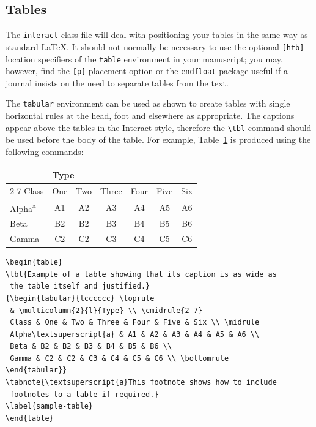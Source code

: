 \documentclass[]{interact}
\theoremstyle{plain}%
\theoremstyle{definition}
\theoremstyle{remark}
\begin{document}
\subsection{Tables}

The \texttt{interact} class file will deal with positioning your tables in the same way as standard \LaTeX. It should not normally be necessary to use the optional \texttt{[htb]} location specifiers of the \texttt{table} environment in your manuscript; you may, however, find the \verb"[p]" placement option or the \verb"endfloat" package useful if a journal insists on the need to separate tables from the text.

The \texttt{tabular} environment can be used as shown to create tables with single horizontal rules at the head, foot and elsewhere as appropriate. The captions appear above the tables in the \textsf{Interact} style, therefore the \verb"\tbl" command should be used before the body of the table. For example, Table~\ref{sample-table} is produced using the following commands:
\begin{table}
{\begin{tabular}{lcccccc} \toprule
 & \multicolumn{2}{l}{Type} \\ \cmidrule{2-7}
 Class & One & Two & Three & Four & Five & Six \\ \midrule
 Alpha\textsuperscript{a} & A1 & A2 & A3 & A4 & A5 & A6 \\
 Beta & B2 & B2 & B3 & B4 & B5 & B6 \\
 Gamma & C2 & C2 & C3 & C4 & C5 & C6 \\ \bottomrule
\end{tabular}}
\label{sample-table}
\end{table}
\begin{verbatim}
\begin{table}
\tbl{Example of a table showing that its caption is as wide as
 the table itself and justified.}
{\begin{tabular}{lcccccc} \toprule
 & \multicolumn{2}{l}{Type} \\ \cmidrule{2-7}
 Class & One & Two & Three & Four & Five & Six \\ \midrule
 Alpha\textsuperscript{a} & A1 & A2 & A3 & A4 & A5 & A6 \\
 Beta & B2 & B2 & B3 & B4 & B5 & B6 \\
 Gamma & C2 & C2 & C3 & C4 & C5 & C6 \\ \bottomrule
\end{tabular}}
\tabnote{\textsuperscript{a}This footnote shows how to include
 footnotes to a table if required.}
\label{sample-table}
\end{table}
\end{verbatim}
\end{document}
